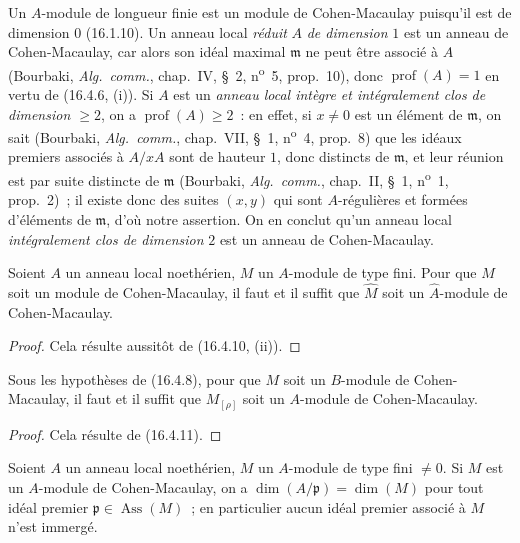 Un $A$-module de longueur finie est un module de Cohen-Macaulay puisqu'il est
de dimension $0$ (16.1.10). Un anneau local \emph{réduit} $A$ \emph{de dimension} $1$ est un
anneau de Cohen-Macaulay, car alors son idéal maximal $\mathfrak{m}$ ne peut
être associé à $A$ (Bourbaki, \emph{Alg.~comm.}, chap.~IV, \S~2, n\textsuperscript{o}~5,
prop.~10), donc $\operatorname{prof}(A)=1$ en vertu de (16.4.6, (i)). Si $A$
est un \emph{anneau local intègre et intégralement clos de dimension $\geq2$},
on a $\operatorname{prof}(A)\geq2$~: en effet, si $x\neq0$ est un élément de
$\mathfrak{m}$, on sait (Bourbaki, \emph{Alg.~comm.}, chap.~VII, \S~1, n\textsuperscript{o}~4,
prop.~8) que les idéaux premiers associés à $A/xA$ sont de hauteur $1$, donc
distincts de $\mathfrak{m}$, et leur réunion est par suite distincte de
$\mathfrak{m}$ (Bourbaki, \emph{Alg.~comm.}, chap.~II, \S~1, n\textsuperscript{o}~1, prop.~2)~;
il existe donc des suites $(x,y)$ qui sont $A$-régulières et formées
d'éléments de $\mathfrak{m}$, d'où notre assertion. On en conclut qu'un anneau
local \emph{intégralement clos de dimension} $2$ est un anneau de Cohen-Macaulay.

\begin{proposition}[16.5.2]
\label{0.16.5.2-fr}
Soient $A$ un anneau local noethérien, $M$ un $A$-module de type fini. Pour que
$M$ soit un module de Cohen-Macaulay, il faut et il suffit que $\widehat M$
soit un $\widehat A$-module de Cohen-Macaulay.
\end{proposition}

\begin{proof}
Cela résulte aussitôt de (16.4.10, (ii)).
\end{proof}

\begin{proposition}[16.5.3]
\label{0.16.5.3-fr}
Sous les hypothèses de \textup{(16.4.8)}, pour que $M$ soit un $B$-module de
Cohen-Macaulay, il faut et il suffit que $M_{[\rho]}$ soit un $A$-module de
Cohen-Macaulay.
\end{proposition}

\begin{proof}
Cela résulte de (16.4.11).
\end{proof}

\begin{proposition}[16.5.4]
\label{0.16.5.4-fr}
Soient $A$ un anneau local noethérien, $M$ un $A$-module de type fini $\neq0$.
Si $M$ est un $A$-module de Cohen-Macaulay, on a
$\dim(A/\mathfrak{p})=\dim(M)$ pour tout idéal premier
$\mathfrak{p}\in\operatorname{Ass}(M)$~; en particulier aucun idéal premier
associé à $M$ n'est immergé.
\end{proposition}

